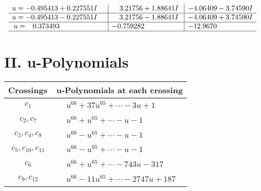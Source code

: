 \documentclass[1p]{elsarticle_modified}
\theoremstyle{definition}
\begin{document}
$$\begin{array}{c|c|c}
\begin{aligned}
u &= -0.495413 + 0.227551 I\end{aligned}
 & \phantom{-}3.21756 + 1.88641 I & -4.06409 - 3.74590 I \\ \hline\begin{aligned}
u &= -0.495413 - 0.227551 I\end{aligned}
 & \phantom{-}3.21756 - 1.88641 I & -4.06409 + 3.74590 I \\ \hline\begin{aligned}
u &= \phantom{-}0.373493\phantom{ +0.000000I}\end{aligned}
 & -0.759282\phantom{ +0.000000I} & -12.9670\phantom{ +0.000000I}\\
 \hline 
 \end{array}$$\newpage
\newpage\renewcommand{\arraystretch}{1}
\centering \section*{ II. u-Polynomials}
\begin{tabular}{m{50pt}|m{274pt}}
Crossings & \hspace{64pt}u-Polynomials at each crossing \\
\hline $$\begin{aligned}c_{1}\end{aligned}$$&$\begin{aligned}
&u^{66}+37 u^{65}+\cdots-3 u+1
\end{aligned}$\\
\hline $$\begin{aligned}c_{2},c_{7}\end{aligned}$$&$\begin{aligned}
&u^{66}+u^{65}+\cdots- u-1
\end{aligned}$\\
\hline $$\begin{aligned}c_{3},c_{4},c_{8}\end{aligned}$$&$\begin{aligned}
&u^{66}- u^{65}+\cdots- u-1
\end{aligned}$\\
\hline $$\begin{aligned}c_{5},c_{10},c_{11}\end{aligned}$$&$\begin{aligned}
&u^{66}- u^{65}+\cdots- u-1
\end{aligned}$\\
\hline $$\begin{aligned}c_{6}\end{aligned}$$&$\begin{aligned}
&u^{66}+u^{65}+\cdots-743 u-317
\end{aligned}$\\
\hline $$\begin{aligned}c_{9},c_{12}\end{aligned}$$&$\begin{aligned}
&u^{66}-11 u^{65}+\cdots-2747 u+187
\end{aligned}$\\
\hline
\end{tabular}\newpage\renewcommand{\arraystretch}{1}
\end{document}
